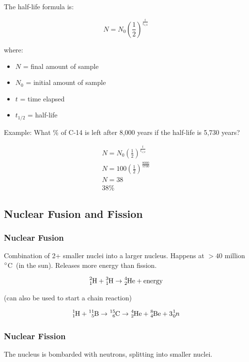 \documentclass[a4paper, 12pt]{article}
\newcommand{\degC}{$\degree$C \,}
\begin{document}
The half-life formula is:

\begin{equation}\label{eq:halflife}
N = N_0 \left(\frac{1}{2}\right)^{\frac{t}{t_{1/2}}}
\end{equation}

where:

\begin{itemize}[leftmargin=*, nosep]
\item $N$ = final amount of sample
\item $N_0$ = initial amount of sample
\item $t$ = time elapsed
\item $t_{1/2}$ = half-life
\end{itemize}

Example: What \% of C-14 is left after 8,000 years if the half-life is 5,730 years?

\begin{gather*}
N = N_0 \left(\frac{1}{2}\right)^{\frac{t}{t_{1/2}}} \\
N = 100 \left(\frac{1}{2}\right)^{\frac{8000}{5730}} \\
N = 38 \\
\boxed{38\%}
\end{gather*}

\subsection*{Nuclear Fusion and Fission}

\subsubsection*{Nuclear Fusion}
Combination of 2+ smaller nuclei into a larger nucleus. Happens at $>40$ million \degC (in the sun). Releases more energy than fission.

$$\ce{^{2}_{1}H} + \ce{^{3}_{1}H} \to \ce{^{4}_{2}He} + \mathrm{energy}$$

(can also be used to start a chain reaction)

$$\ce{^{1}_{1}H} + \ce{^{11}_{5}B} \to \ce{^{15}_{6}C} \to \ce{^{4}_{2}He} + \ce{^{8}_{4}Be} + 3\ce{^{1}_{0}$n$}$$

\subsubsection*{Nuclear Fission}
The nucleus is bombarded with neutrons, splitting into smaller nuclei.
\end{document}
